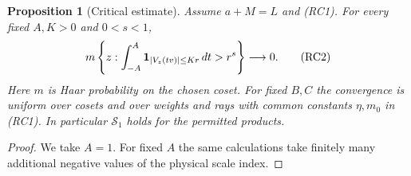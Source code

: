 \documentclass[11pt,a4paper]{article}
\newtheorem{proposition}[theorem]{Proposition}
\begin{document}
\begin{proposition}[Critical estimate]\label{prop:critical}
Assume $a+M=L$ and (RC1). For every fixed $A,K>0$ and $0<s<1$, 
\begin{equation}
 m\left\{z:\int_{-A}^A {\bf1}_{|V_z(tv)|\le Kr}\,dt>r^s\right\}
 \longrightarrow0. \tag{RC2}
\end{equation}
Here $m$ is Haar probability on the chosen coset. For fixed $B,C$ the
convergence is uniform over cosets and over weights and rays with common
constants $\eta,m_0$ in (RC1). In particular $\mathcal S_1$ holds for the permitted products.
\end{proposition}
\begin{proof}
We take $A=1$. For fixed $A$ the same calculations take finitely
many additional negative values of the physical scale index.


\end{proof}
\end{document}
